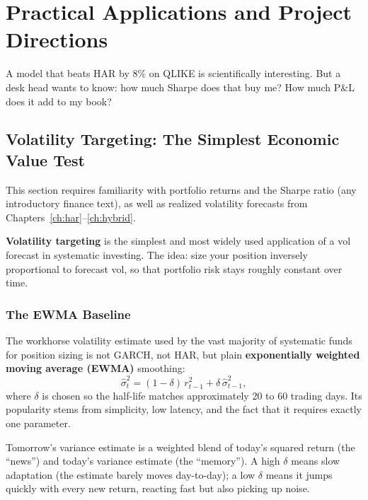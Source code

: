 \chapter{Practical Applications and Project Directions}
\label{ch:applications}

A model that beats HAR by 8\% on QLIKE is scientifically interesting.
But a desk head wants to know: how much Sharpe does that buy me?
How much P\&L does it add to my book?

\section{Volatility Targeting: The Simplest Economic Value Test}
\label{sec:vol-targeting}

\begin{prereq}[Background]
This section requires familiarity with portfolio returns and the Sharpe ratio (any introductory finance text),
as well as realized volatility forecasts from Chapters~\ref{ch:har}--\ref{ch:hybrid}.
\end{prereq}

\textbf{Volatility targeting} is the simplest and most widely used application of a vol forecast in systematic investing.
The idea: size your position inversely proportional to forecast vol, so that portfolio risk stays roughly constant over time.

\subsection{The EWMA Baseline}
\label{subsec:ewma-baseline}

The workhorse volatility estimate used by the vast majority of systematic funds for position sizing is not GARCH, not HAR, but plain \textbf{exponentially weighted moving average (EWMA)} smoothing:
\begin{equation}
\label{eq:ewma}
\hat\sigma^2_t = (1-\delta)\,r_{t-1}^2 + \delta\,\hat\sigma^2_{t-1},
\end{equation}
where $\delta$ is chosen so the half-life matches approximately 20 to 60 trading days.
Its popularity stems from simplicity, low latency, and the fact that it requires exactly one parameter.

\begin{intuition}
Tomorrow's variance estimate is a weighted blend of today's squared return (the ``news'') and today's variance estimate (the ``memory'').
A high $\delta$ means slow adaptation (the estimate barely moves day-to-day); a low $\delta$ means it jumps quickly with every new return, reacting fast but also picking up noise.
\end{intuition}


